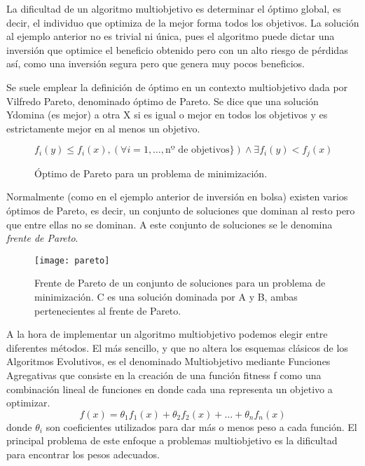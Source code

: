 La dificultad de un algoritmo multiobjetivo es determinar el óptimo global, es decir, el individuo que optimiza de la mejor forma todos los objetivos. La solución al ejemplo anterior no es trivial ni única, pues el algoritmo puede dictar una inversión que optimice el beneficio obtenido pero con un alto riesgo de pérdidas así, como una inversión segura pero que genera muy pocos beneficios.

\blankline

Se suele emplear la definición de óptimo en un contexto multiobjetivo dada por Vilfredo Pareto, denominado óptimo de Pareto. Se dice que una solución Ydomina (es mejor) a otra X si es igual o mejor en todos los objetivos y es estrictamente mejor en al menos un objetivo\cite{cervigon09}.
\begin{figure}[H]
\begin{equation}
f_i(y) \leq f_i(x), (\forall i = 1, \dots, \textrm{nº de objetivos}\}) \wedge \exists f_i(y) < f_j(x)
\end{equation}
\caption{Óptimo de Pareto para un problema de minimización.}
\end{figure}

Normalmente (como en el ejemplo anterior de inversión en bolsa) existen varios óptimos de Pareto, es decir, un conjunto de soluciones que dominan al resto pero que entre ellas no se dominan. A este conjunto de soluciones se le denomina \textit{frente de Pareto}.

\begin{figure}[H]
\centering
\texttt{[image: pareto]}
\caption{Frente de Pareto de un conjunto de soluciones para un problema de minimización. C es una solución dominada por A y B, ambas pertenecientes al frente de Pareto\cite{pictPareto}.}
\end{figure}

A la hora de implementar un algoritmo multiobjetivo podemos elegir entre diferentes  métodos. El más sencillo, y que no altera los esquemas clásicos de los Algoritmos Evolutivos, es el denominado Multiobjetivo mediante Funciones Agregativas que consiste en la creación de una función fitness f como una combinación lineal de funciones en donde cada una representa un objetivo a optimizar.
\begin{equation}
f(x) = \theta_1f_1(x) + \theta_2f_2(x) + \dots + \theta_nf_n(x)
\end{equation}
donde $\theta_i$ son coeficientes utilizados para dar más o menos peso a cada función. El principal problema de este enfoque a problemas multiobjetivo es la dificultad para encontrar los pesos adecuados.

